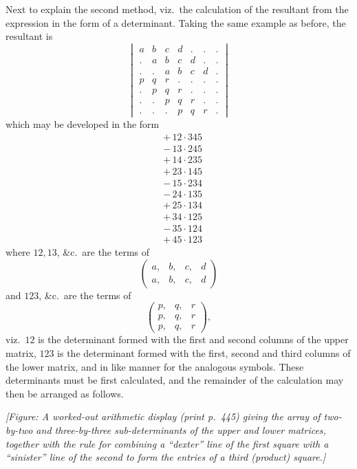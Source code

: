 \documentclass[11pt]{article}
\begin{document}
\medskip

\noindent Next to explain the second method, viz.\ the calculation of the resultant from the expression in the form of a determinant. Taking the same example as before, the resultant is
\[
\begin{vmatrix}
a & b & c & d & . & . & . \\
. & a & b & c & d & . & . \\
. & . & a & b & c & d & . \\
p & q & r & . & . & . & . \\
. & p & q & r & . & . & . \\
. & . & p & q & r & . & . \\
. & . & . & p & q & r & .
\end{vmatrix}
\]
which may be developed in the form
\[
\begin{aligned}
&+\, 12 \cdot 345\\
&-\, 13 \cdot 245\\
&+\, 14 \cdot 235\\
&+\, 23 \cdot 145\\
&-\, 15 \cdot 234\\
&-\, 24 \cdot 135\\
&+\, 25 \cdot 134\\
&+\, 34 \cdot 125\\
&-\, 35 \cdot 124\\
&+\, 45 \cdot 123
\end{aligned}
\]
where $12, 13$, \&c.\ are the terms of
\[
\begin{pmatrix} a, & b, & c, & d \\ a, & b, & c, & d \end{pmatrix}
\]
and $123$, \&c.\ are the terms of
\[
\begin{pmatrix} p, & q, & r \\ p, & q, & r \\ p, & q, & r \end{pmatrix},
\]
viz.\ $12$ is the determinant formed with the first and second columns of the upper matrix, $123$ is the determinant formed with the first, second and third columns of the lower matrix, and in like manner for the analogous symbols. These determinants must be first calculated, and the remainder of the calculation may then be arranged as follows.

\medskip

\noindent\textit{[Figure: A worked-out arithmetic display (print p.~445) giving the array of two-by-two and three-by-three sub-determinants of the upper and lower matrices, together with the rule for combining a ``dexter'' line of the first square with a ``sinister'' line of the second to form the entries of a third (product) square.]}
\end{document}
